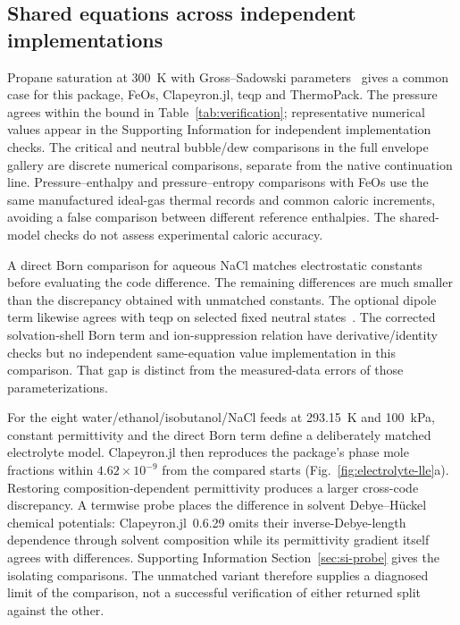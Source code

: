 \subsection{Shared equations across independent implementations}
\label{sec:cross-code}
Propane saturation at 300~K with Gross--Sadowski parameters~\citep{Gross2001} gives a common case for this package, FeOs, Clapeyron.jl, teqp and ThermoPack.
The pressure agrees within the bound in Table~\ref{tab:verification}; representative numerical values appear in the Supporting Information for independent implementation checks.
The critical and neutral bubble/dew comparisons in the full envelope gallery are discrete numerical comparisons, separate from the native continuation line.
Pressure--enthalpy and pressure--entropy comparisons with FeOs use the same manufactured ideal-gas thermal records and common caloric increments, avoiding a false comparison between different reference enthalpies.
The shared-model checks do not assess experimental caloric accuracy.

A direct Born comparison for aqueous NaCl matches electrostatic constants before evaluating the code difference.
The remaining differences are much smaller than the discrepancy obtained with unmatched constants.
The optional dipole term likewise agrees with teqp on selected fixed neutral states~\citep{Gross2006,bellImplementingEquationState2022}.
The corrected solvation-shell Born term and ion-suppression relation have derivative/identity checks but no independent same-equation value implementation in this comparison.
That gap is distinct from the measured-data errors of those parameterizations.

For the eight water/ethanol/isobutanol/NaCl feeds at 293.15~K and 100~kPa, constant permittivity and the direct Born term define a deliberately matched electrolyte model.
Clapeyron.jl then reproduces the package's phase mole fractions within $4.62\times10^{-9}$ from the compared starts (Fig.~\ref{fig:electrolyte-lle}a).
Restoring composition-dependent permittivity produces a larger cross-code discrepancy.
A termwise probe places the difference in solvent Debye--H\"uckel chemical potentials: Clapeyron.jl~0.6.29 omits their inverse-Debye-length dependence through solvent composition while its permittivity gradient itself agrees with differences.
Supporting Information Section~\ref{sec:si-probe} gives the isolating comparisons.
The unmatched variant therefore supplies a diagnosed limit of the comparison, not a successful verification of either returned split against the other.

